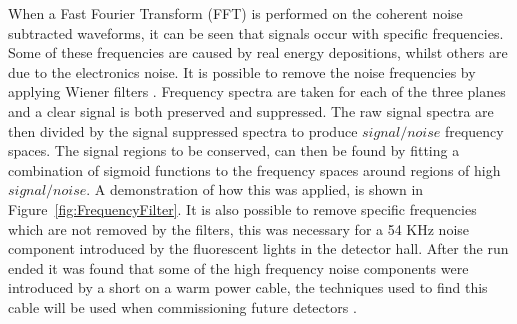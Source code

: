 When a Fast Fourier Transform (FFT) \citep{CoTuFFT} is performed on the coherent noise subtracted waveforms, it can be seen that signals occur with specific frequencies. Some of these frequencies are caused by real energy depositions, whilst others are due to the electronics noise. It is possible to remove the noise frequencies by applying Wiener filters \citep{WienerFilter}. Frequency spectra are taken for each of the three planes and a clear signal is both preserved and suppressed. The raw signal spectra are then divided by the signal suppressed spectra to produce $signal/noise$ frequency spaces. The signal regions to be conserved, can then be found by fitting a combination of sigmoid functions to the frequency spaces around regions of high $signal/noise$. A demonstration of how this was applied, is shown in Figure~\ref{fig:FrequencyFilter}. It is also possible to remove specific frequencies which are not removed by the filters, this was necessary for a 54 KHz noise component introduced by the fluorescent lights in the detector hall. After the run ended it was found that some of the high frequency noise components were introduced by a short on a warm power cable, the techniques used to find this cable will be used when commissioning future detectors \citep{35tonNoiseMeeting}. \\

